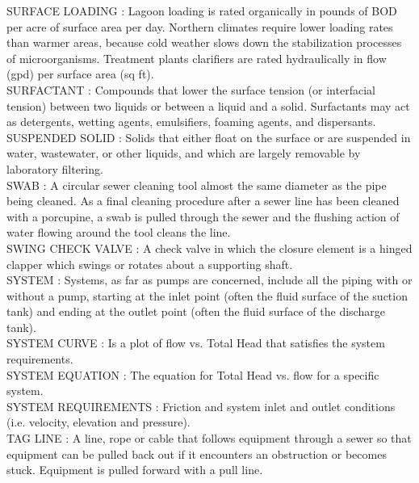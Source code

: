 SURFACE LOADING :  Lagoon loading is rated organically in pounds of BOD per acre of surface area per day. Northern climates require lower loading rates than warmer areas, because cold weather slows down the stabilization processes of microorganisms. Treatment plants clarifiers are rated hydraulically in flow (gpd) per surface area (sq ft).\\
\vspace{0.15cm}
SURFACTANT :  Compounds that lower the surface tension (or interfacial tension) between two liquids or between a liquid and a solid. Surfactants may act as detergents, wetting agents, emulsifiers, foaming agents, and dispersants.\\
\vspace{0.15cm}
SUSPENDED SOLID :  Solids that either float on the surface or are suspended in water, wastewater, or other liquids, and which are largely removable by laboratory filtering.\\
\vspace{0.15cm}
SWAB :  A circular sewer cleaning tool almost the same diameter as the pipe being cleaned. As a final cleaning procedure after a sewer line has been cleaned with a porcupine, a swab is pulled through the sewer and the flushing action of water flowing around the tool cleans the line. \\
\vspace{0.15cm}
SWING CHECK VALVE :   A check valve in which the closure element is a hinged clapper which swings or rotates about a supporting shaft.\\
\vspace{0.15cm}
SYSTEM :   Systems, as far as pumps are concerned, include all the piping with or without a pump, starting at the inlet point (often the fluid surface of the suction tank) and ending at the outlet point (often the fluid surface of the discharge tank).\\
\vspace{0.15cm}
SYSTEM CURVE :   Is a plot of flow vs. Total Head that satisfies the system requirements.\\
\vspace{0.15cm}
SYSTEM EQUATION :   The equation for Total Head vs. flow for a specific system.\\
\vspace{0.15cm}
SYSTEM REQUIREMENTS :   Friction and system inlet and outlet conditions (i.e. velocity, elevation and pressure).\\
\vspace{0.15cm}
TAG LINE :  A line, rope or cable that follows equipment through a sewer so that equipment can be pulled back out if it encounters an obstruction or becomes stuck. Equipment is pulled forward with a pull line. \\
